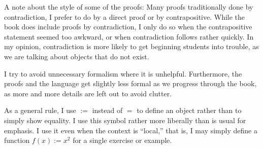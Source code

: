 \documentclass[12pt]{book}
\begin{document}
\medskip

A note about the style of some of the proofs:  Many proofs traditionally done by contradiction, I prefer to do by a direct proof or by contrapositive.
While the book does include proofs by contradiction, 
I only do so when the contrapositive statement seemed too awkward, or when  contradiction follows rather quickly.
In my opinion, contradiction is more likely to get beginning students into trouble, as we are talking about objects that do not exist.

I try to avoid unnecessary formalism where it is unhelpful.
Furthermore, the proofs and the language get slightly less formal as we progress through the book, as more and more details are left out to avoid clutter.

As a general rule, I use $:=$ instead of $=$ to define an object rather than to simply show equality.
I use this symbol rather more liberally than is usual for emphasis.
I use it even when the context is ``local,''
that is, I may simply define a function $f(x) := x^2$ for a single exercise or example.

%

\end{document}
